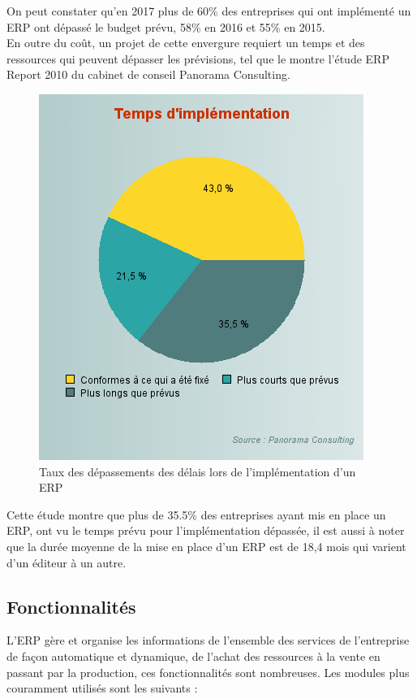         On peut constater qu’en 2017 plus de 60\% des entreprises qui ont implémenté un ERP ont dépassé le budget prévu, 58\% en 2016 et 55\% en 2015.\\

        En outre du coût, un projet de cette envergure requiert un temps et des ressources qui peuvent dépasser les prévisions, tel que le montre l’étude ERP Report 2010 du cabinet de conseil Panorama Consulting.\\

        \begin{figure}[H]
            \centering
                \includegraphics[scale=0.65]{chapitre2/graph-taux-implementation.png}
            \caption{Taux des dépassements des délais lors de l’implémentation d’un ERP}
        \end{figure} 

        Cette étude montre que plus de 35.5\% des entreprises ayant mis en place un ERP, ont vu le temps prévu pour l’implémentation dépassée, il est aussi à noter que la durée moyenne de la mise en place d’un ERP est de 18,4 mois qui varient d’un éditeur à un autre.

    \subsection{Fonctionnalités}
        L’ERP gère et organise les informations de l’ensemble des services de l’entreprise de façon automatique et dynamique, de l’achat des ressources à la vente en passant par la production, ces fonctionnalités sont nombreuses. Les modules plus couramment utilisés sont les suivants : \\
        
